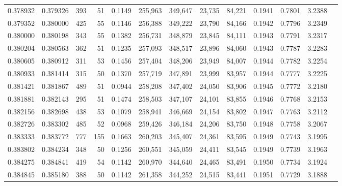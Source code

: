 \begin{tabular}{rrrrrrrrrrrrr}
0.378932 & 0.379326 &    393 &    51 &                                     0.1149 & 255,963 & 349,647 &  23,735 &  84,221 & 0.1941 & 0.7801 & 3.2388 \\
0.379352 & 0.380000 &    425 &    55 &                                     0.1146 & 256,388 & 349,222 &  23,790 &  84,166 & 0.1942 & 0.7796 & 3.2349 \\
0.380000 & 0.380198 &    343 &    55 &                                     0.1382 & 256,731 & 348,879 &  23,845 &  84,111 & 0.1943 & 0.7791 & 3.2317 \\
0.380204 & 0.380563 &    362 &    51 &                                     0.1235 & 257,093 & 348,517 &  23,896 &  84,060 & 0.1943 & 0.7787 & 3.2283 \\
0.380605 & 0.380912 &    311 &    53 &                                     0.1456 & 257,404 & 348,206 &  23,949 &  84,007 & 0.1944 & 0.7782 & 3.2254 \\
0.380933 & 0.381414 &    315 &    50 &                                     0.1370 & 257,719 & 347,891 &  23,999 &  83,957 & 0.1944 & 0.7777 & 3.2225 \\
0.381421 & 0.381867 &    489 &    51 &                                     0.0944 & 258,208 & 347,402 &  24,050 &  83,906 & 0.1945 & 0.7772 & 3.2180 \\
0.381881 & 0.382143 &    295 &    51 &                                     0.1474 & 258,503 & 347,107 &  24,101 &  83,855 & 0.1946 & 0.7768 & 3.2153 \\
0.382156 & 0.382698 &    438 &    53 &                                     0.1079 & 258,941 & 346,669 &  24,154 &  83,802 & 0.1947 & 0.7763 & 3.2112 \\
0.382726 & 0.383302 &    485 &    52 &                                     0.0968 & 259,426 & 346,184 &  24,206 &  83,750 & 0.1948 & 0.7758 & 3.2067 \\
0.383333 & 0.383772 &    777 &   155 &                                     0.1663 & 260,203 & 345,407 &  24,361 &  83,595 & 0.1949 & 0.7743 & 3.1995 \\
0.383802 & 0.384234 &    348 &    50 &                                     0.1256 & 260,551 & 345,059 &  24,411 &  83,545 & 0.1949 & 0.7739 & 3.1963 \\
0.384275 & 0.384841 &    419 &    54 &                                     0.1142 & 260,970 & 344,640 &  24,465 &  83,491 & 0.1950 & 0.7734 & 3.1924 \\
0.384845 & 0.385180 &    388 &    50 &                                     0.1142 & 261,358 & 344,252 &  24,515 &  83,441 & 0.1951 & 0.7729 & 3.1888 \\

\end{tabular}
